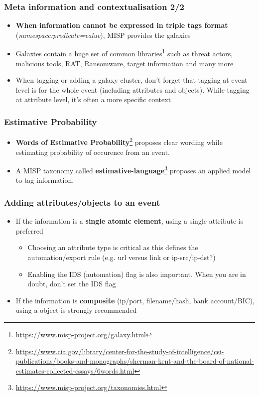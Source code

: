 \begin{frame}
\frametitle{Meta information and contextualisation 2/2}
\begin{itemize}
        \item {\bf When information cannot be expressed in triple tags format} ({\it namespace:predicate=value}), MISP provides the galaxies
        \item Galaxies contain a huge set of common libraries\footnote{\url{https://www.misp-project.org/galaxy.html}} such as threat actors, malicious tools, RAT, Ransomware, target information and many more
        \item When tagging or adding a galaxy cluster, don't forget that tagging at event level is for the whole event (including attributes and objects). While tagging at attribute level, it's often a more specific context
\end{itemize}
\end{frame}

\begin{frame}
        \frametitle{Estimative Probability}
\begin{itemize}
        \item {\bf Words of Estimative Probability}\footnote{\url{https://www.cia.gov/library/center-for-the-study-of-intelligence/csi-publications/books-and-monographs/sherman-kent-and-the-board-of-national-estimates-collected-essays/6words.html}} proposes clear wording while estimating probability of occurence from an event.
        \item A MISP taxonomy called {\bf estimative-language}\footnote{\url{https://www.misp-project.org/taxonomies.html}} proposes an applied model to tag information.
\end{itemize}

\end{frame}

\begin{frame}
\frametitle{Adding attributes/objects to an event}
\begin{itemize}
        \item If the information is a {\bf single atomic element}, using a single attribute is preferred
                \begin{itemize}
                        \item Choosing an attribute type is critical as this defines the automation/export rule (e.g. url versus link or ip-src/ip-dst?)
                        \item Enabling the IDS (automation) flag is also important. When you are in doubt, don't set the IDS flag
                \end{itemize}
        \item If the information is {\bf composite} (ip/port, filename/hash, bank account/BIC), using a object is strongly recommended
\end{itemize}
\end{frame}

